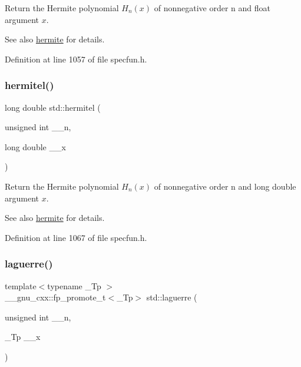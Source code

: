 Return the Hermite polynomial $ H_n(x) $ of nonnegative order n and float argument $ x $.

\begin{DoxySeeAlso}{See also}
\hyperlink{group__tr29124__math__spec__func_ga8bd1626f1e3f7256c4fd13579f881183}{hermite} for details. 
\end{DoxySeeAlso}


Definition at line 1057 of file specfun.\+h.

\mbox{\label{group__tr29124__math__spec__func_ga21f8e312ee3e65286f86bf141b0f32e0}} 
\subsubsection{\texorpdfstring{hermitel()}{hermitel()}}
{\footnotesize\ttfamily long double std\+::hermitel (\begin{DoxyParamCaption}\item[{unsigned int}]{\+\_\+\+\_\+n,  }\item[{long double}]{\+\_\+\+\_\+x }\end{DoxyParamCaption})\hspace{0.3cm}{\ttfamily [inline]}}

Return the Hermite polynomial $ H_n(x) $ of nonnegative order n and {\ttfamily long double} argument $ x $.

\begin{DoxySeeAlso}{See also}
\hyperlink{group__tr29124__math__spec__func_ga8bd1626f1e3f7256c4fd13579f881183}{hermite} for details. 
\end{DoxySeeAlso}


Definition at line 1067 of file specfun.\+h.

\mbox{\label{group__tr29124__math__spec__func_ga9d7b24a11dad27690387405548973ef9}} 
\subsubsection{\texorpdfstring{laguerre()}{laguerre()}}
{\footnotesize\ttfamily template$<$typename \+\_\+\+Tp $>$ \\
\+\_\+\+\_\+gnu\+\_\+cxx\+::fp\+\_\+promote\+\_\+t$<$\+\_\+\+Tp$>$ std\+::laguerre (\begin{DoxyParamCaption}\item[{unsigned int}]{\+\_\+\+\_\+n,  }\item[{\+\_\+\+Tp}]{\+\_\+\+\_\+x }\end{DoxyParamCaption})\hspace{0.3cm}{\ttfamily [inline]}}

